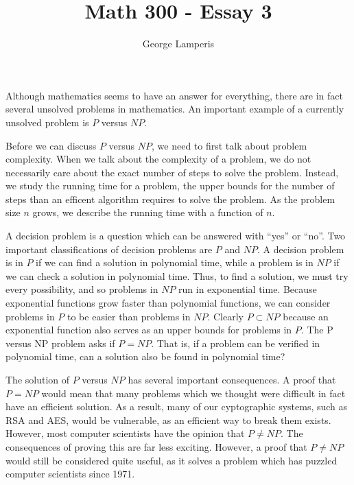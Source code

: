 \documentclass[12pt]{article}
\title{Math 300 - Essay 3}
\author{George Lamperis}
\date{}
\theoremstyle{mystyle}
\begin{document}
\maketitle

Although mathematics seems to have an answer for everything, there are in fact
several unsolved problems in mathematics. An important example of a currently
unsolved problem is $P$ versus $NP$.


Before we can discuss $P$ versus $NP$, we need to first talk about problem
complexity.
When we talk about the complexity of a problem, we do not necessarily care
about the exact number of steps to solve the problem. Instead, we study the
running time for a problem, the upper bounds for the number of steps than an
efficent algorithm requires to solve the problem. As the problem size $n$ grows,
we describe the running time with a function of $n$.

A decision problem is a question which can be answered with ``yes'' or ``no''.
Two important classifications of decision problems are $P$ and $NP$.  A decision
problem is in $P$ if we can find a solution in polynomial time, while a problem
is in $NP$ if we can check a solution in polynomial time. Thus, to find a
solution, we must try every possibility, and so problems in $NP$ run in exponential time. 
Because exponential functions grow faster than polynomial functions, we can
consider problems in $P$ to be easier than problems in $NP$. Clearly $P \subset
NP$ because an exponential function also serves as an upper bounds for problems in $P$.
The P versus NP problem asks if $P = NP$. That is, if a problem can be verified
in polynomial time, can a solution also be found in polynomial time?


The solution of $P$ versus $NP$ has several important consequences. A proof that
$P = NP$ would mean that many problems which we thought were difficult in fact
have an efficient solution. As a result, many of our cyptographic systems,
such as RSA and AES, would be vulnerable, as an efficient way to break them
exists. However, most computer scientists have the opinion that $P \neq NP$. The
consequences of proving this are far less exciting. However, a proof that $P
\neq NP$ would still be considered quite useful, as it solves a problem which
has puzzled computer scientists since 1971.
\end{document}
